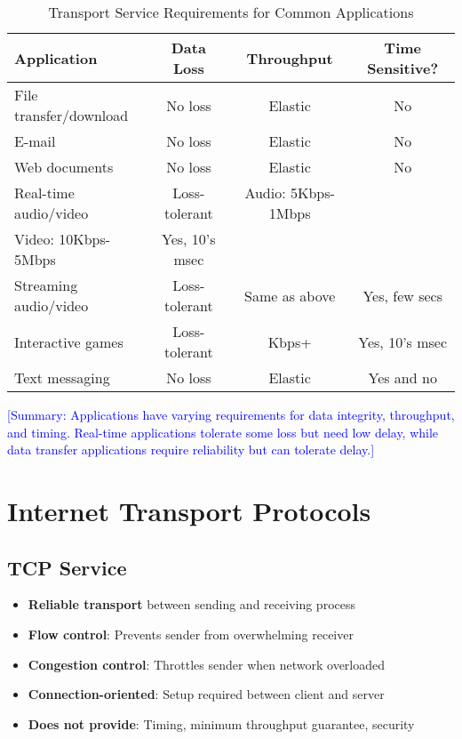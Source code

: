 \documentclass[12pt]{article}
\begin{document}
\begin{table}[h]
    \centering
    \begin{tabular}{p{4cm}ccc}
        \toprule
        \textbf{Application}   & \textbf{Data Loss} & \textbf{Throughput} & \textbf{Time Sensitive?} \\
        \midrule
        File transfer/download & No loss            & Elastic             & No                       \\
        E-mail                 & No loss            & Elastic             & No                       \\
        Web documents          & No loss            & Elastic             & No                       \\
        Real-time audio/video  & Loss-tolerant      & Audio: 5Kbps-1Mbps                             \\Video: 10Kbps-5Mbps & Yes, 10's msec \\
        Streaming audio/video  & Loss-tolerant      & Same as above       & Yes, few secs            \\
        Interactive games      & Loss-tolerant      & Kbps+               & Yes, 10's msec           \\
        Text messaging         & No loss            & Elastic             & Yes and no               \\
        \bottomrule
    \end{tabular}
    \caption{Transport Service Requirements for Common Applications}
    \label{tab:app-requirements}
\end{table}

\textcolor{blue}{[Summary: Applications have varying requirements for data integrity, throughput, and timing. Real-time applications tolerate some loss but need low delay, while data transfer applications require reliability but can tolerate delay.]}

\section{Internet Transport Protocols}

\subsection{TCP Service}
\begin{itemize}
    \item \textbf{Reliable transport} between sending and receiving process
    \item \textbf{Flow control}: Prevents sender from overwhelming receiver
    \item \textbf{Congestion control}: Throttles sender when network overloaded
    \item \textbf{Connection-oriented}: Setup required between client and server
    \item \textbf{Does not provide}: Timing, minimum throughput guarantee, security
\end{itemize}
\end{document}

